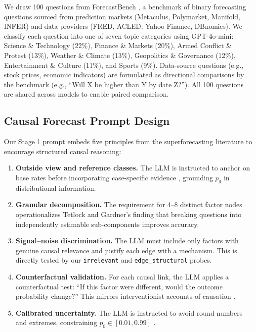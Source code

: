 \documentclass[11pt]{article}
\begin{document}
We draw 100 questions from ForecastBench \cite{zou2024forecastbench}, a benchmark of binary forecasting questions sourced from prediction markets (Metaculus, Polymarket, Manifold, INFER) and data providers (FRED, ACLED, Yahoo Finance, DBnomics). We classify each question into one of seven topic categories using GPT-4o-mini: Science \& Technology (22\%), Finance \& Markets (20\%), Armed Conflict \& Protest (13\%), Weather \& Climate (13\%), Geopolitics \& Governance (12\%), Entertainment \& Culture (11\%), and Sports (9\%). Data-source questions (e.g., stock prices, economic indicators) are formulated as directional comparisons by the benchmark (e.g., ``Will X be higher than Y by date Z?''). All 100 questions are shared across models to enable paired comparison.

\subsection{Causal Forecast Prompt Design}
\label{sec:superforecasting}

Our Stage 1 prompt embeds five principles from the superforecasting literature \cite{tetlock2015superforecasting} to encourage structured causal reasoning:

\begin{enumerate}
    \item \textbf{Outside view and reference classes.} The LLM is instructed to anchor on base rates before incorporating case-specific evidence \cite{kahneman2011thinking}, grounding $p_0$ in distributional information.

    \item \textbf{Granular decomposition.} The requirement for 4--8 distinct factor nodes operationalizes Tetlock and Gardner's finding that breaking questions into independently estimable sub-components improves accuracy.

    \item \textbf{Signal--noise discrimination.} The LLM must include only factors with genuine causal relevance and justify each edge with a mechanism. This is directly tested by our \texttt{irrelevant} and \texttt{edge\_structural} probes.

    \item \textbf{Counterfactual validation.} For each causal link, the LLM applies a counterfactual test: ``If this factor were different, would the outcome probability change?'' This mirrors interventionist accounts of causation \cite{woodward2005making}.

    \item \textbf{Calibrated uncertainty.} The LLM is instructed to avoid round numbers and extremes, constraining $p_0 \in [0.01, 0.99]$ \cite{baron2014heuristics}.
\end{enumerate}
\end{document}
